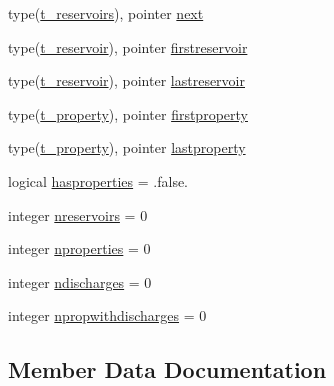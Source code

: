 \begin{DoxyCompactItemize}
\item 
type(\mbox{\hyperlink{structmodulereservoirs_1_1t__reservoirs}{t\+\_\+reservoirs}}), pointer \mbox{\hyperlink{structmodulereservoirs_1_1t__reservoirs_aaa6e133a55b1d116a37252d19195ed64}{next}}
\item 
type(\mbox{\hyperlink{structmodulereservoirs_1_1t__reservoir}{t\+\_\+reservoir}}), pointer \mbox{\hyperlink{structmodulereservoirs_1_1t__reservoirs_a8e5b5335464fb843c0eaf99071d60fad}{firstreservoir}}
\item 
type(\mbox{\hyperlink{structmodulereservoirs_1_1t__reservoir}{t\+\_\+reservoir}}), pointer \mbox{\hyperlink{structmodulereservoirs_1_1t__reservoirs_a20317133d709351b5a54b5ff0ddbbe45}{lastreservoir}}
\item 
type(\mbox{\hyperlink{structmodulereservoirs_1_1t__property}{t\+\_\+property}}), pointer \mbox{\hyperlink{structmodulereservoirs_1_1t__reservoirs_a6dc693fd3afd6cd630697d4fa77c5063}{firstproperty}}
\item 
type(\mbox{\hyperlink{structmodulereservoirs_1_1t__property}{t\+\_\+property}}), pointer \mbox{\hyperlink{structmodulereservoirs_1_1t__reservoirs_ad7e685bbedb2e0f78cfab3cb2fc4aa82}{lastproperty}}
\item 
logical \mbox{\hyperlink{structmodulereservoirs_1_1t__reservoirs_ac517cc233d9ed09a30574510839398e0}{hasproperties}} = .false.
\item 
integer \mbox{\hyperlink{structmodulereservoirs_1_1t__reservoirs_a62ee5f73b408c3cac619a78571c35f3c}{nreservoirs}} = 0
\item 
integer \mbox{\hyperlink{structmodulereservoirs_1_1t__reservoirs_a5fe0b8173b53a8c7614bc62aba0b971f}{nproperties}} = 0
\item 
integer \mbox{\hyperlink{structmodulereservoirs_1_1t__reservoirs_afcc5a3ddae526fa530f25ddd2f3beaac}{ndischarges}} = 0
\item 
integer \mbox{\hyperlink{structmodulereservoirs_1_1t__reservoirs_a98eb285f4cbafe976ae5ae169e7740cb}{npropwithdischarges}} = 0
\end{DoxyCompactItemize}


\subsection{Member Data Documentation}
\mbox{\label{structmodulereservoirs_1_1t__reservoirs_a603fba732ed19161730c80e8a99e91c9}} 
